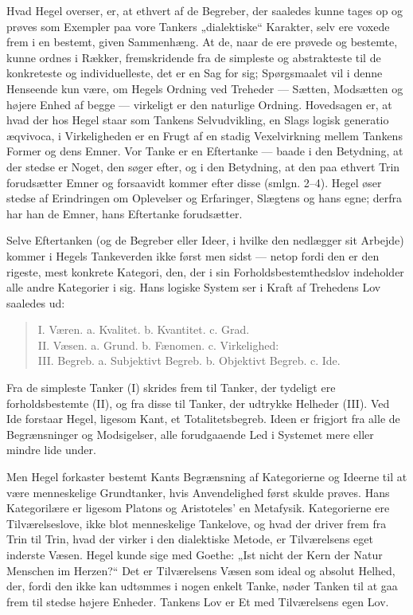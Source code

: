\documentclass[12pt,a4paper]{book}
\newcommand{\apage}[1]{\marginnote{\footnotesize\textit{[#1]}}}
\begin{document}
Hvad Hegel overser, er, at ethvert af de Begreber, der saaledes kunne
tages op og prøves som Exempler paa vore Tankers „dialektiske“ Karakter,
selv ere voxede frem i en bestemt, given Sammenhæng. At de, naar de ere
prøvede og bestemte, kunne ordnes i Rækker, fremskridende fra de
simpleste og abstrakteste til de konkreteste og individuelleste, det er
en Sag for sig; Spørgsmaalet vil i denne Henseende kun være, om Hegels
Ordning ved Treheder --- Sætten, Modsætten og højere Enhed af begge ---
virkeligt er den naturlige Ordning. Hovedsagen er, at hvad der hos Hegel
staar som Tankens Selvudvikling, en Slags logisk generatio æqvivoca, i
Virkeligheden er en Frugt af en stadig Vexelvirkning mellem Tankens
Former og dens Emner. Vor Tanke er en Eftertanke --- baade i den
Betydning, at der stedse er Noget, den søger efter, og i den Betydning,
at den paa ethvert Trin forudsætter Emner og forsaavidt kommer efter
disse (smlgn. 2--4). Hegel øser stedse af Erindringen om Oplevelser og
Erfaringer, Slægtens og hans egne; derfra har han de Emner, hans
Eftertanke forudsætter.

Selve Eftertanken (og de Begreber eller Ideer, i hvilke den nedlægger sit
Arbejde) kommer i Hegels Tankeverden ikke først men sidst --- netop fordi
den er den rigeste, mest \apage{149} konkrete Kategori, den, der i sin
Forholdsbestemthedslov indeholder alle andre Kategorier i sig. Hans
logiske System ser i Kraft af Trehedens Lov saaledes ud:

\begin{quote}
I. Væren. a. Kvalitet. b. Kvantitet. c. Grad.\\
II. Væsen. a. Grund. b. Fænomen. c. Virkelighed:\\
III. Begreb. a. Subjektivt Begreb. b. Objektivt Begreb. c. Ide.
\end{quote}

Fra de simpleste Tanker (I) skrides frem til Tanker, der tydeligt ere
forholdsbestemte (II), og fra disse til Tanker, der udtrykke Helheder
(III). Ved Ide forstaar Hegel, ligesom Kant, et Totalitetsbegreb. Ideen
er frigjort fra alle de Begrænsninger og Modsigelser, alle forudgaaende
Led i Systemet mere eller mindre lide under.

Men Hegel forkaster bestemt Kants Begrænsning af Kategorierne og Ideerne
til at være menneskelige Grundtanker, hvis Anvendelighed først skulde
prøves. Hans Kategorilære er ligesom Platons og Aristoteles' en
Metafysik. Kategorierne ere Tilværelseslove, ikke blot menneskelige
Tankelove, og hvad der driver frem fra Trin til Trin, hvad der virker i
den dialektiske Metode, er Tilværelsens eget inderste Væsen. Hegel kunde
sige med Goethe: „Ist nicht der Kern der Natur Menschen im Herzen?“ Det
er Tilværelsens Væsen som ideal og absolut Helhed, der, fordi den ikke
kan udtømmes i nogen enkelt Tanke, nøder Tanken til at gaa frem til
stedse højere Enheder. Tankens Lov er Et med Tilværelsens egen Lov.
\end{document}
